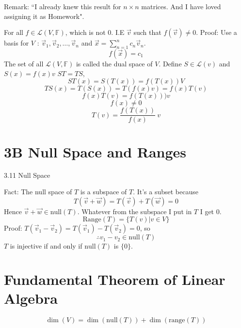 \documentclass[letter]{article}
\begin{document}
Remark: ``I already knew this result for $n \times n$ matrices. And I have loved assigning it as Homework".

For all $f \in \mathcal{L}(V, \mathbb{F})$, which is not 0. I.E $\vec{v}$ such that $f(\vec{v}) \neq 0$. Proof: Use a basis for $V$ : $\vec{v}_1, \vec{v}_2, \ldots, \vec{v}_n$ and $\vec{x} = \sum_{n=1}^{n} c_n \vec{v}_n$. 
\[
f(\vec{x}) = c_1
\] 
The set of all $\mathcal{L}(V, \mathbb{F})$ is called the dual space of $V$. Define $S \in \mathcal{L}(v)$ and $S(x) = f(x) v$ 
$ST = TS$, 
\[
ST(x) = S(T(x)) = f(T(x))V
\] 
\[
TS(x) = T(S(x)) = T(f(x)v) = f(x) T(v)
\] 
\[
f(x) T(v) = f(T(x)))v
\] 
\[
f(x) \neq  0
\] 
\[
T(v) = \frac{f(T(x))}{f(x)} \ v
\] 

\section{3B Null Space and Ranges} 
3.11 Null Space 

Fact: The null space of $T$ is a subspace of $T$. It's a subset because 
\[
T(\vec{v}+\vec{w}) = T(\vec{v}) + T(\vec{w}) = 0
\] Hence $\vec{v}+\vec{w} \in \text{null}(T)$. 
Whatever from the subspace I put in $T$ I get $0$. 
\[
\text{Range}(T) = \{T (v) | v \in V\} 
\] 
Proof: $T(\vec{v}_1 - \vec{v}_2) = T(\vec{v}_1) - T(\vec{v}_2) = 0$, so 
\[
\therefore v_1 - v_2 \in \text{null} (T)
\] 
$T$ is injective if and only if $\text{null}(T)$ is $\{0\} $.


\section{Fundamental Theorem of Linear Algebra} 

\[
\dim (V) = \dim (\text{null}(T)) + \dim (\text{range}(T))
\] 
\end{document}
